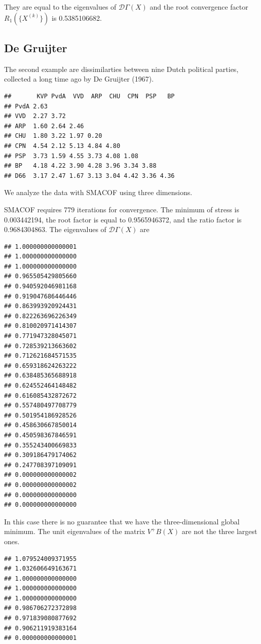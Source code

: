 \documentclass[
  12pt,
]{article}
\begin{document}
They are equal to the eigenvalues of \(\mathcal{D}\Gamma(X)\) and the root convergence factor
\(R_1(\{X^{(k)}\})\) is 0.5385106682.

\subsection{De Gruijter}\label{de-gruijter}

The second example are dissimilarties between nine Dutch political parties, collected a long time ago by De Gruijter (1967).

\begin{verbatim}
##       KVP PvdA  VVD  ARP  CHU  CPN  PSP   BP
## PvdA 2.63                                   
## VVD  2.27 3.72                              
## ARP  1.60 2.64 2.46                         
## CHU  1.80 3.22 1.97 0.20                    
## CPN  4.54 2.12 5.13 4.84 4.80               
## PSP  3.73 1.59 4.55 3.73 4.08 1.08          
## BP   4.18 4.22 3.90 4.28 3.96 3.34 3.88     
## D66  3.17 2.47 1.67 3.13 3.04 4.42 3.36 4.36
\end{verbatim}

We analyze the data with SMACOF using three dimensions.

SMACOF requires 779 iterations for convergence. The minimum of stress is 0.003442194, the root factor is equal to 0.9565946372, and the ratio factor is 0.9684304863. The eigenvalues of \(\mathcal{D}\Gamma(X)\) are

\begin{verbatim}
## 1.000000000000001 
## 1.000000000000000 
## 1.000000000000000 
## 0.965505429805660 
## 0.940592046981168 
## 0.919047686446446 
## 0.863993920924431 
## 0.822263696226349 
## 0.810020971414307 
## 0.771947328045071 
## 0.728539213663602 
## 0.712621684571535 
## 0.659318624263222 
## 0.638485365688918 
## 0.624552464148482 
## 0.616085432872672 
## 0.557480497708779 
## 0.501954186928526 
## 0.458630667850014 
## 0.450598367846591 
## 0.355243400669833 
## 0.309186479174062 
## 0.247708397109091 
## 0.000000000000002 
## 0.000000000000002 
## 0.000000000000000 
## 0.000000000000000
\end{verbatim}

In this case there is no guarantee that we have the three-dimensional global minimum. The unit eigenvalues of the matrix \(V^+B(X)\) are not the three largest ones.

\begin{verbatim}
## 1.079524009371955 
## 1.032606649163671 
## 1.000000000000000 
## 1.000000000000000 
## 1.000000000000000 
## 0.986706272372898 
## 0.971839080877692 
## 0.906211919383164 
## 0.000000000000001
\end{verbatim}
\end{document}
